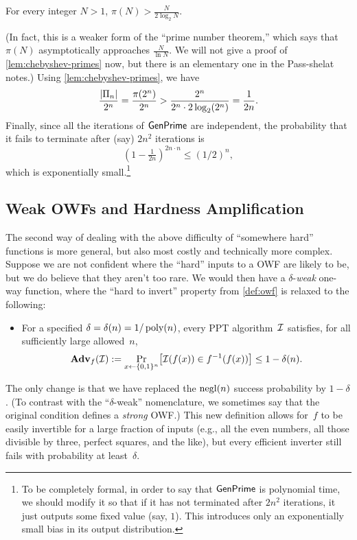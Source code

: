 \documentclass[11pt]{article}
\begin{document}
\begin{lemma}[Chebyshev]
  \label{lem:chebyshev-primes}
  For every integer $N > 1$, $\pi(N) > \frac{N}{2 \log_{2} N}$.
\end{lemma}
(In fact, this is a weaker form of the ``prime number theorem,'' which
says that $\pi(N)$ asymptotically approaches $\frac{N}{\ln N}$.  We
will not give a proof of \cref{lem:chebyshev-primes} now, but
there is an elementary one in the Pass-shelat notes.)  Using
\cref{lem:chebyshev-primes}, we have
\[ \frac{\lvert\Pi_{n}\rvert}{2^{n}} = \frac{\pi(2^{n})}{2^{n}} >
  \frac{2^{n}}{2^{n} \cdot 2 \log_{2}(2^{n})} = \frac{1}{2n}. \]
Finally, since all the iterations of $\mathsf{GenPrime}$ are
independent, the probability that it fails to terminate after (say)
$2n^{2}$ iterations is
\[ (1-\tfrac{1}{2n})^{2n \cdot n} \leq (1/2)^{n}, \] which is
exponentially small.\footnote{To be completely formal, in order to say
  that $\mathsf{GenPrime}$ is polynomial time, we should modify it so
  that if it has not terminated after $2n^{2}$ iterations, it just
  outputs some fixed value (say, $1$).  This introduces only an
  exponentially small bias in its output distribution.}

\subsection{Weak OWFs and Hardness Amplification}
\label{sec:hardn-ampl}

The second way of dealing with the above difficulty of ``somewhere hard'' functions is more general, but also most costly and technically more complex.
Suppose we are not confident where the ``hard'' inputs to a OWF are likely to be, but we do believe that they aren't too rare.
We would then have a $\delta$-\emph{weak} one-way function, where the ``hard to invert'' property from \cref{def:owf} is relaxed to the following:
\begin{itemize}
\item For a specified $\delta = \delta(n) = 1/\operatorname{poly}(n)$, every PPT algorithm~$\mathcal{I}$ satisfies, for all sufficiently large allowed~$n$,
  \[ \advan_{f}(\Inv) := \Pr_{x \gets \bit^{n}} \bracks*{\Inv(f(x)) \in f^{-1}(f(x))} \leq 1-\delta(n) \text. \]
\end{itemize}
The only change is that we have replaced the $\operatorname{negl}(n)$ success probability by $1-\delta$.
(To contrast with the ``$\delta$-weak'' nomenclature, we sometimes say that the original condition defines a \emph{strong} OWF.)
This new definition allows for~$f$ to be easily invertible for a large fraction of inputs (e.g., all the even numbers, all those divisible by three, perfect squares, and the like), but every efficient inverter still fails with probability at least~$\delta$.
\end{document}
